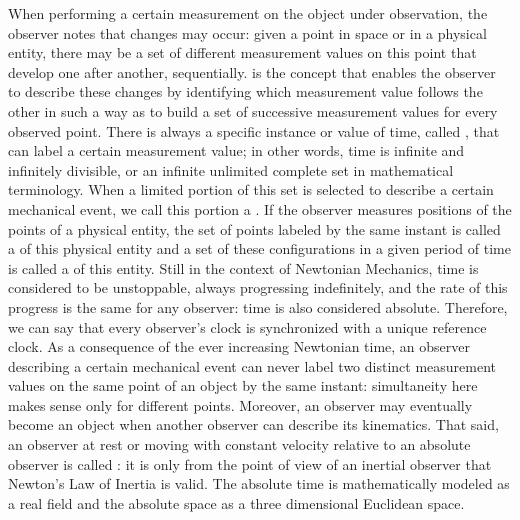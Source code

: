 When performing a certain measurement on the object under observation, the observer notes that changes may occur: given a point in space or in a physical entity, there may be a set of different measurement values on this point that develop one after another, sequentially.  is the concept that enables the observer to describe these changes by identifying which measurement value follows the other in such a way as to build a set of successive measurement values for every observed point.  There is always a specific instance or value of time, called , that can label a certain measurement value; in other words, time is infinite and infinitely divisible, or an infinite unlimited complete set in mathematical terminology. When a limited portion of this set is selected to describe a certain mechanical event, we call this portion a . If the observer measures positions of the points of a physical entity, the set of points labeled by the same instant is called a  of this physical entity and a set of these configurations in a given period of time is called a  of this entity. Still in the context of Newtonian Mechanics, time is considered to be unstoppable, always progressing indefinitely, and the rate of this progress is the same for any observer: time is also considered absolute. Therefore, we can say that every observer's clock is synchronized with a unique reference clock. As a consequence of the ever increasing Newtonian time, an observer describing a certain mechanical event can never label two distinct measurement values on the same point of an object by the same instant: simultaneity here makes sense only for different points. Moreover, an observer may eventually become an object when another observer can describe its kinematics. That said, an observer at rest or moving with constant velocity relative to an absolute observer is called : it is only from the point of view of an inertial observer that Newton's Law of Inertia is valid. The absolute time is mathematically modeled as a real field and the absolute space as a three dimensional Euclidean space.   


